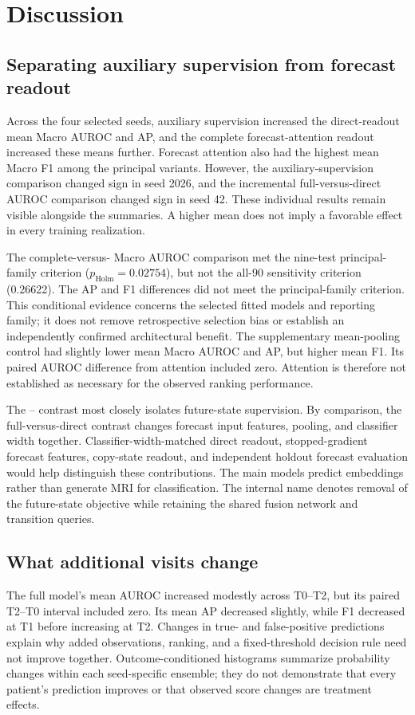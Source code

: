 \section{Discussion}
\label{sec:discussion}
\subsection{Separating auxiliary supervision from forecast readout}
Across the four selected seeds, auxiliary supervision increased the direct-readout mean Macro AUROC and AP, and the complete forecast-attention readout increased these means further. Forecast attention also had the highest mean Macro F1 among the principal variants. However, the auxiliary-supervision comparison changed sign in seed 2026, and the incremental full-versus-direct AUROC comparison changed sign in seed 42. These individual results remain visible alongside the summaries. A higher mean does not imply a favorable effect in every training realization.

The complete-versus-\nojepa{} Macro AUROC comparison met the nine-test principal-family criterion ($p_{\mathrm{Holm}}=0.02754$), but not the all-90 sensitivity criterion (0.26622). The AP and F1 differences did not meet the principal-family criterion. This conditional evidence concerns the selected fitted models and reporting family; it does not remove retrospective selection bias or establish an independently confirmed architectural benefit. The supplementary mean-pooling control had slightly lower mean Macro AUROC and AP, but higher mean F1. Its paired AUROC difference from attention included zero. Attention is therefore not established as necessary for the observed ranking performance.

The \direct{}--\nojepa{} contrast most closely isolates future-state supervision. By comparison, the full-versus-direct contrast changes forecast input features, pooling, and classifier width together. Classifier-width-matched direct readout, stopped-gradient forecast features, copy-state readout, and independent holdout forecast evaluation would help distinguish these contributions. The main models predict embeddings rather than generate MRI for classification. The internal name \nojepa{} denotes removal of the future-state objective while retaining the shared fusion network and transition queries.

\subsection{What additional visits change}
The full model's mean AUROC increased modestly across T0--T2, but its paired T2--T0 interval included zero. Its mean AP decreased slightly, while F1 decreased at T1 before increasing at T2. Changes in true- and false-positive predictions explain why added observations, ranking, and a fixed-threshold decision rule need not improve together. Outcome-conditioned histograms summarize probability changes within each seed-specific ensemble; they do not demonstrate that every patient's prediction improves or that observed score changes are treatment effects.

